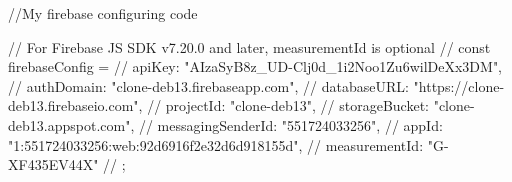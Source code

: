 
//My firebase configuring code

// For Firebase JS SDK v7.20.0 and later, measurementId is optional
// const firebaseConfig = {
//   apiKey: "AIzaSyB8z_UD-Clj0d_1i2Noo1Zu6wilDeXx3DM",
//   authDomain: "clone-deb13.firebaseapp.com",
//   databaseURL: "https://clone-deb13.firebaseio.com",
//   projectId: "clone-deb13",
//   storageBucket: "clone-deb13.appspot.com",
//   messagingSenderId: "551724033256",
//   appId: "1:551724033256:web:92d6916f2e32d6d918155d",
//   measurementId: "G-XF435EV44X"
// };
